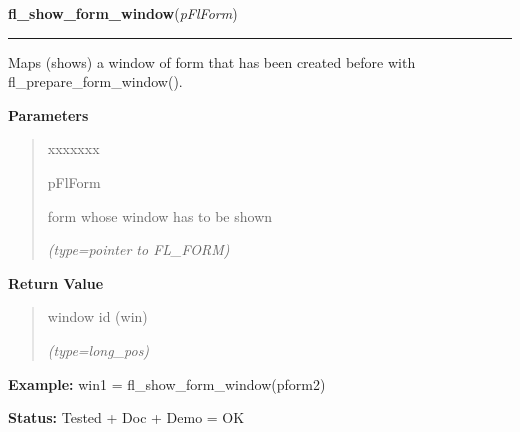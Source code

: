 \hspace{.8\funcindent}\begin{boxedminipage}{\funcwidth}

    \raggedright \textbf{fl\_show\_form\_window}(\textit{pFlForm})

    \vspace{-1.5ex}

    \rule{\textwidth}{0.5\fboxrule}
\setlength{\parskip}{2ex}
    Maps (shows) a window of form that has been created before with 
    fl\_prepare\_form\_window().

\setlength{\parskip}{1ex}
      \textbf{Parameters}
      \vspace{-1ex}

      \begin{quote}
        \begin{Ventry}{xxxxxxx}

          \item[pFlForm]

          form whose window has to be shown

            {\it (type=pointer to FL\_FORM)}

        \end{Ventry}

      \end{quote}

      \textbf{Return Value}
    \vspace{-1ex}

      \begin{quote}
      window id (win)

      {\it (type=long\_pos)}

      \end{quote}

\textbf{Example:} win1 = fl\_show\_form\_window(pform2)



\textbf{Status:} Tested + Doc + Demo = OK



    \end{boxedminipage}

    \label{xformslib:flbasic:fl_adjust_form_size}

    \vspace{0.5ex}

